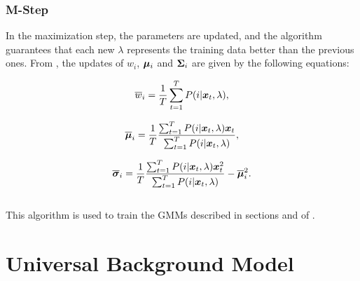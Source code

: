 \subsubsection*{M-Step}

In the maximization step, the parameters are updated, and the algorithm guarantees that each new $\lambda$ represents the training data better than the previous ones. From , the updates of $w_i$, $\boldsymbol{\mu}_i$ and $\boldsymbol{\Sigma}_i$ are given by the following equations:

\begin{equation}
    \overline{w}_i = \frac{1}{T} \sum_{t=1}^T \postprob{i}{\dvec{x}_t, \lambda},
    \label{eq:m-step-weight}
\end{equation}

\begin{equation}
    \overline{\dvec{\mu}}_i = \frac{1}{T} \frac{\sum_{t=1}^T \postprob{i}{\dvec{x}_t, \lambda} \dvec{x}_t}{\sum_{t=1}^T \postprob{i}{\dvec{x}_t, \lambda}},
    \label{eq:m-step-means}
\end{equation}

\begin{equation}
    \overline{\dvec{\sigma}}_i = \frac{1}{T} \frac{\sum_{t=1}^T \postprob{i}{\dvec{x}_t, \lambda} \dvec{x}_t^2}{\sum_{t=1}^T \postprob{i}{\dvec{x}_t, \lambda}} - \overline{\dvec{\mu}}_i^2.
    \label{eq:m-step-means}
\end{equation}
\\

This algorithm is used to train the GMMs described in sections  and  of .

\section{Universal Background Model}